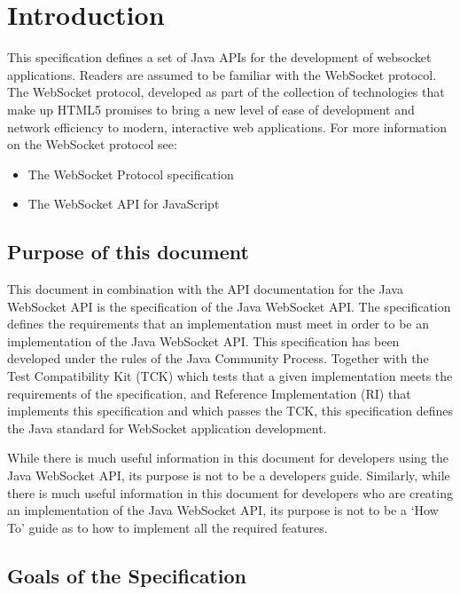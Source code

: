 \chapter{Introduction}

This specification defines a set of Java APIs for the development of websocket applications. Readers are assumed to be familiar with the WebSocket protocol. The WebSocket protocol, developed as part of the collection of technologies that make up HTML5 promises to bring a new level of ease of development and network efficiency to modern, interactive web applications. For more information on the WebSocket protocol see:

\begin{itemize}
\item The WebSocket Protocol specification \cite{rfc6455}
\item The WebSocket API for JavaScript \cite{websocketsw3c}
\end{itemize}

\section{Purpose of this document}
\label{purpose}

This document in combination with the API documentation for the Java WebSocket API  is the specification of the Java WebSocket API. The specification defines the requirements that an implementation must meet in order to be an implementation of the Java WebSocket API. This specification has been developed under the rules of the Java Community Process. Together with the Test Compatibility Kit (TCK) which tests that a given implementation meets the requirements of the specification, and Reference Implementation (RI) that implements this specification and which passes the TCK, this specification defines the Java standard for WebSocket application development.

While there is much useful information in this document for developers using the Java WebSocket API, its purpose is not to be a developers guide. Similarly, while there is much useful information in this document for developers who are creating an implementation of the Java WebSocket API, its purpose is not to be a ‘How To’ guide as to how to implement all the required features.

\section{Goals of the Specification}


